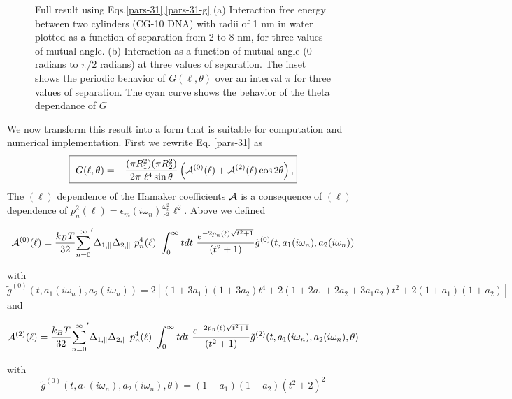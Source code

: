 \documentclass[onecolumn,letterpaper,amsmath,amssymb,floatfix,aps,superscriptaddress]{revtex4}
\begin{document}
\begin{figure}[t!]
\begin{center}
\begin{minipage}[b]{0.40\textwidth}
\begin{center}
\end{center}
\end{minipage}
\caption{Full result using Eqs.\ref{pars-31},\ref{pars-31-g} (a) Interaction free energy between two cylinders (CG-10 DNA) with radii of 1 nm in water plotted as a function of separation from 2 to 8 nm, for three values of mutual angle. (b) Interaction as a function of mutual angle (0 radians to $\pi/2$ radians) at three values of separation.  The inset shows the periodic behavior of $G(\ell,\theta)$ over an interval $\pi$ for three values of separation. The cyan curve shows the behavior of the theta dependance of $G$  }
\label{fiddle1}
\end{center}
\end{figure} 

We now transform this result into a form that is suitable for computation and numerical implementation. First we rewrite Eq. \ref{pars-31} as
\begin{equation}
  \fbox{
    $\displaystyle{
G(\ell,\theta) = - \frac{ (\pi R_1^{2})(\pi R_2^{2}) }{2 \pi~\ell^{4} \sin{\theta}} \left( {\cal A}^{(0)}(\ell) + {\cal A}^{(2)}(\ell) \cos 2\theta \right) ,}$}
\label{pars-31a}
\end{equation}
The $(\ell)$ dependence of the Hamaker coefficients $\cal A$ is a consequence of $(\ell)$ dependence of $p_n^{2}(\ell) =  \epsilon_m(i \omega_n) \frac{\omega_n^{2}}{c^{2}} \ell^{2}$. Above we defined
\begin{widetext}
\begin{equation}
{\cal A}^{(0)}(\ell) = \frac{k_BT}{32}  {\sum_{n=0}^{\infty}}' \Delta_{1,\parallel} \Delta_{2,\parallel} ~p_n^{4}(\ell) ~\int_0^{\infty} t dt ~\frac{e^{- 2 p_n(\ell) \sqrt{t^{2} + 1}}}{(t^{2} + 1)} \tilde g^{(0)}(t, a_1(i \omega_n), a_2(i \omega_n))
\label{eq:a0}
\end{equation}
\end{widetext}
with
\begin{equation}
\tilde g^{(0)}(t, a_1(i \omega_n), a_2(i \omega_n)) = 2 \left[ (1+3a_1)(1+3a_2) t^{4} + 2 (1+2a_1+2a_2+3a_1a_2) t^{2}  + 2(1+a_1)(1+a_2)\right]
\end{equation}
and
\begin{widetext}
\begin{equation}
{\cal A}^{(2)}(\ell) = \frac{k_BT}{32}  {\sum_{n=0}^{\infty}}' \Delta_{1,\parallel} \Delta_{2,\parallel} ~p_n^{4}(\ell) ~\int_0^{\infty} t dt ~\frac{e^{- 2 p_n(\ell) \sqrt{t^{2} + 1}}}{(t^{2} + 1)} \tilde g^{(2)}(t, a_1(i \omega_n), a_2(i \omega_n), \theta)
\end{equation}
\end{widetext}
with
\begin{equation}<C-LeftRelease>
\tilde g^{(0)}(t, a_1(i \omega_n), a_2(i \omega_n), \theta) = (1-a_1)(1-a_2)(t^{2} + 2)^2
\label{befgqw}
\end{equation}
\end{document}
